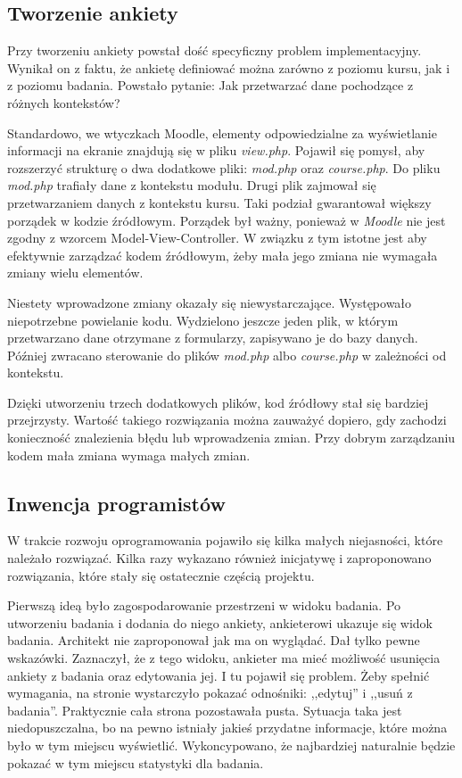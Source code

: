 \subsection{Tworzenie ankiety}
Przy tworzeniu ankiety powstał dość specyficzny problem implementacyjny. Wynikał on z faktu, że ankietę definiować można zarówno z poziomu kursu, jak i z poziomu badania. Powstało pytanie: Jak przetwarzać dane pochodzące z różnych kontekstów? 

Standardowo, we wtyczkach Moodle, elementy odpowiedzialne za wyświetlanie informacji na ekranie znajdują się w pliku \emph{view.php}. Pojawił się pomysł, aby rozszerzyć strukturę o dwa dodatkowe pliki: \emph{mod.php} oraz \emph{course.php}. Do pliku \emph{mod.php} trafiały dane z kontekstu modułu. Drugi plik zajmował się przetwarzaniem danych z kontekstu kursu. Taki podział gwarantował większy porządek w kodzie źródłowym. Porządek był ważny, ponieważ w \emph{Moodle} nie jest zgodny z wzorcem Model-View-Controller. W związku z tym istotne jest aby efektywnie zarządzać kodem źródłowym, żeby mała jego zmiana nie wymagała zmiany wielu elementów.

Niestety wprowadzone zmiany okazały się niewystarczające. Występowało niepotrzebne powielanie kodu. Wydzielono jeszcze jeden plik, w którym przetwarzano dane otrzymane z formularzy, zapisywano je do bazy danych. Później zwracano sterowanie do plików \emph{mod.php} albo \emph{course.php} w zależności od kontekstu.

Dzięki utworzeniu trzech dodatkowych plików, kod źródłowy stał się bardziej przejrzysty. Wartość takiego rozwiązania można zauważyć dopiero, gdy zachodzi konieczność znalezienia błędu lub wprowadzenia zmian. Przy dobrym zarządzaniu kodem mała zmiana wymaga małych zmian.

\subsection{Inwencja programistów}

W trakcie rozwoju oprogramowania pojawiło się kilka małych niejasności, które należało rozwiązać. Kilka razy wykazano również inicjatywę i zaproponowano rozwiązania, które stały się ostatecznie częścią projektu.

Pierwszą ideą było zagospodarowanie przestrzeni w widoku badania. Po utworzeniu badania i dodania do niego ankiety, ankieterowi ukazuje się widok badania. Architekt nie zaproponował jak ma on wyglądać. Dał tylko pewne wskazówki. Zaznaczył, że z tego widoku, ankieter ma mieć możliwość usunięcia ankiety z badania oraz edytowania jej. I tu pojawił się problem. Żeby spełnić wymagania, na stronie wystarczyło pokazać odnośniki: ,,edytuj'' i ,,usuń z badania''. Praktycznie cała strona pozostawała pusta. Sytuacja taka jest niedopuszczalna, bo na pewno istniały jakieś przydatne informacje, które można było w tym miejscu wyświetlić. Wykoncypowano, że najbardziej naturalnie będzie pokazać w tym miejscu statystyki dla badania.

